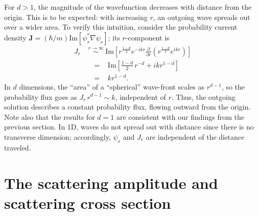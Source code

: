 \documentclass[pra,11pt]{revtex4}
\begin{document}
For $d > 1$, the magnitude of the wavefunction decreases with distance
from the origin.  This is to be expected: with increasing $r$,
an outgoing wave spreads out over a wider area.  To verify this
intuition, consider the probability current density
$\mathbf{J} = (\hbar/m) \mathrm{Im}\left[\psi_s^*\nabla\psi_s\right]$;
its $r$-component is
$$\begin{aligned}J_r \; &\overset{r\rightarrow\infty}{\sim} \; \mathrm{Im}\left[r^{\frac{1-d}{2}} e^{-ikr} \frac{\partial}{\partial r}\left(r^{\frac{1-d}{2}} e^{ikr}\right)\right] \\ &\;\;=\;\;\;\mathrm{Im}\left[\frac{1-d}{2}\, r^{-d} + ik r^{1-d}\right]\\ &\;\;=\;\;\; kr^{1-d}.\end{aligned}$$
In $d$ dimensions, the ``area'' of a ``spherical'' wave-front scales
as $r^{d-1}$, so the probability flux goes as $J_r \,r^{d-1} \sim k$,
independent of $r$.  Thus, the outgoing solution describes a constant
probability flux, flowing outward from the origin.  Note also that the
results for $d=1$ are consistent with our findings from the previous
section.  In 1D, waves do not spread out with distance since there is
no transverse dimension; accordingly, $\psi_s$ and $J_r$ are
independent of the distance traveled.

\section{The scattering amplitude and scattering cross section}
\end{document}

